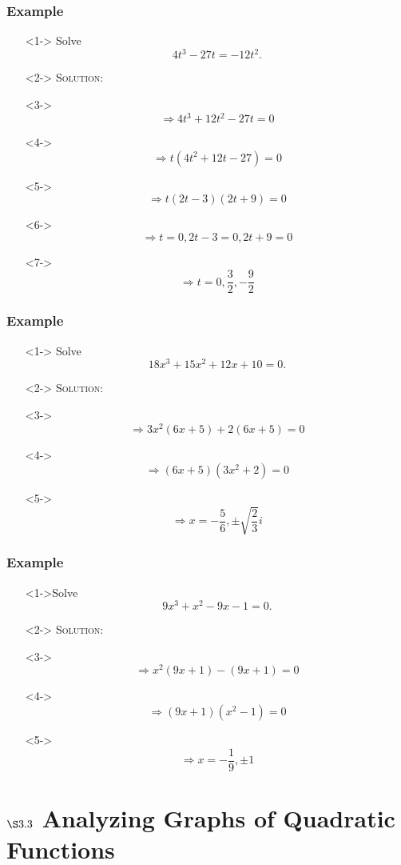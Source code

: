 \documentclass[handout]{beamer}
\begin{document}
\begin{frame}
	\frametitle{Example} 
	\begin{enumerate}
		\item[]<1-> Solve \[ 4t^{3}-27t=-12t^{2}. \] 
		\item[]<2-> \textsc{Solution:} 
		\item[]<3-> \[ \Rightarrow 4t^{3}+12t^{2}-27t=0 \] 
		\item[]<4-> \[ \Rightarrow t(4t^{2}+12t-27)=0 \] 
		\item[]<5-> \[ \Rightarrow t(2t-3)(2t+9)=0 \] 
		\item[]<6-> \[ \Rightarrow t=0, 2t-3=0, 2t+9=0 \] 
		\item[]<7-> \[ \Rightarrow t=0, \frac{3}{2}, -\frac{9}{2} \] 
	\end{enumerate}
\end{frame} 

\begin{frame}
	\frametitle{Example} 
	\begin{enumerate}
		\item[]<1-> Solve \[ 18x^{3}+15x^{2}+12x+10=0. \] 
		\item[]<2-> \textsc{Solution:} 
		\item[]<3-> \[ \Rightarrow 3x^{2}(6x+5)+2(6x+5)=0 \]
		\item[]<4-> \[ \Rightarrow (6x+5)(3x^{2}+2)=0 \]
		\item[]<5-> \[ \Rightarrow x=-\frac{5}{6}, \pm \sqrt{\frac{2}{3}} i \] 
	\end{enumerate} 
\end{frame}

\begin{frame}
	\frametitle{Example}
	\begin{enumerate}
		\item[]<1->Solve \[ 9x^{3}+x^{2}-9x-1=0. \] 
		\item[]<2-> \textsc{Solution:} 
		\item[]<3-> \[ \Rightarrow x^{2}(9x+1)-(9x+1)=0\]  
		\item[]<4-> \[ \Rightarrow (9x+1)(x^{2}-1)=0 \] 
		\item[]<5-> \[ \Rightarrow x=-\frac{1}{9}, \pm 1 \] 
	\end{enumerate}
\end{frame}

\section{$\S3.3$ Analyzing Graphs of Quadratic Functions} 
\end{document}
